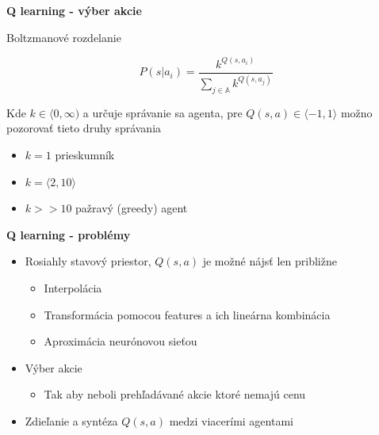 \documentclass[xcolor=dvipsnames]{beamer}
\begin{document}
\begin{frame}{\bf Q learning - výber akcie}

Boltzmanové rozdelanie

\begin{equation}
P(s|a_i) = \frac{k^{Q(s, a_i)}} {{\sum_{j \in \mathbb{A}}{} k^{Q(s, a_j)}}} \nonumber
\end{equation}

Kde $k \in \langle 0, \infty )$ a určuje správanie sa agenta, pre $Q(s, a) \in \langle -1, 1 \rangle$
možno pozorovať tieto druhy správania

\begin{itemize}
\item{$k = 1$ prieskumník}
\item{$k = \langle 2, 10 \rangle$}
\item{$k >> 10$ pažravý (greedy) agent}
\end{itemize}

\end{frame}


\begin{frame}{\bf Q learning - problémy}

\begin{itemize}
\item{Rosiahly stavový priestor, $Q(s, a)$ je možné nájsť len približne}

    \begin{itemize}
    \item{Interpolácia}
    \item{Transformácia pomocou features a ich lineárna kombinácia}
    \item{Aproximácia neurónovou sieťou}
    \end{itemize}

\item{Výber akcie}
    \begin{itemize}
    \item{Tak aby neboli prehľadávané akcie ktoré nemajú cenu}
    \end{itemize}

\item{Zdieľanie a syntéza $Q(s, a)$ medzi viacerími agentami}

\end{itemize}

\end{frame}
\end{document}
